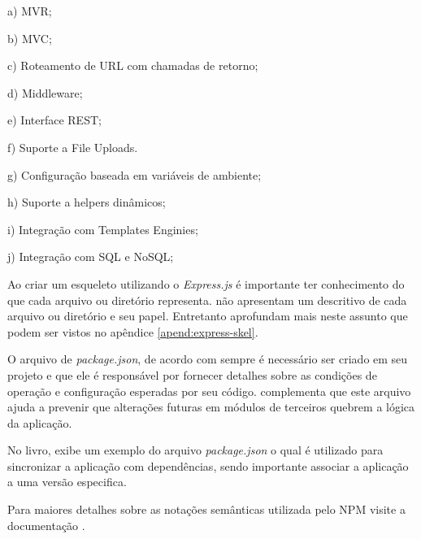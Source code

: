   \begin{compactitem}
    \item[a)] \ac{MVR};   
    
    \item[b)] \ac{MVC};
    
    \item[c)] Roteamento de \ac{URL} com chamadas de retorno;
    
    \item[d)] Middleware;
    
    \item[e)] Interface \ac{REST};
    
    \item[f)] Suporte a File Uploads.
    
    \item[g)] Configuração baseada em variáveis de ambiente;
    
    \item[h)] Suporte a helpers dinâmicos;
    
    \item[i)] Integração com Templates Enginies;
    
    \item[j)] Integração com SQL e NoSQL;
    
  \end{compactitem}
  
  Ao criar um esqueleto utilizando o \textit{Express.js} é importante ter conhecimento do que cada
  arquivo ou diretório representa. \cite{Powers:2012, Hughes:2012} não apresentam um descritivo de cada arquivo 
  ou diretório e seu papel. Entretanto \cite{Pereira:2013, Wilson:2013} aprofundam mais neste assunto que podem ser vistos
  no apêndice \ref{apend:express-skel}.
  
  O arquivo de \textit{package.json}, de acordo com  sempre é necessário ser criado 
  em seu projeto e que ele é responsável por fornecer detalhes sobre as condições de operação e configuração 
  esperadas por seu código. \cite{Wilson:2013} complementa que este arquivo ajuda a prevenir que alterações 
  futuras em módulos de terceiros quebrem a lógica da aplicação.

  No livro, \cite{Wilson:2013} exibe um exemplo do arquivo 
  \textit{package.json} o qual é utilizado para sincronizar a aplicação com dependências, sendo importante associar 
  a aplicação a uma versão especifica. 
  
  Para maiores detalhes sobre as notações semânticas utilizada pelo \ac{NPM} visite a documentação \cite{Semver:2013}.

